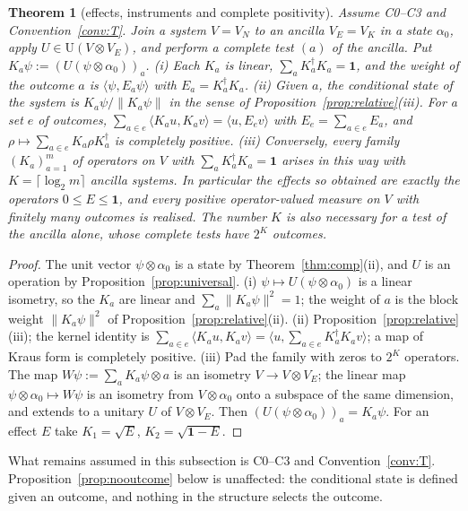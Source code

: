 \documentclass[aps,pra,onecolumn,superscriptaddress,nofootinbib,10pt]{revtex4-2}
\newtheorem{theorem}{Theorem}
\theoremstyle{definition}
\theoremstyle{remark}
\newcommand{\ip}[2]{\langle #1,#2\rangle}
\newcommand{\U}{\mathrm{U}}
\begin{document}
\begin{theorem}[effects, instruments and complete positivity]\label{thm:instruments}
Assume C0--C3 and Convention~\ref{conv:T}.  Join a system $V=V_N$ to
an ancilla $V_E=V_K$ in a state $\alpha_0$, apply $U\in\U(V\otimes V_E)$, and perform a complete test
$(a)$ of the ancilla.  Put $K_a\psi:=(U(\psi\otimes\alpha_0))_a$.
(i) Each $K_a$ is linear, $\sum_aK_a^\dagger K_a=\mathbf1$, and the weight of the outcome $a$ is
$\ip{\psi}{E_a\psi}$ with $E_a=K_a^\dagger K_a$.
(ii) Given $a$, the conditional state of the system is $K_a\psi/\lVert K_a\psi\rVert$ in the sense of
Proposition~\ref{prop:relative}(iii).  For a set $e$ of outcomes,
$\sum_{a\in e}\ip{K_au}{K_av}=\ip{u}{E_ev}$ with $E_e=\sum_{a\in e}E_a$, and
$\rho\mapsto\sum_{a\in e}K_a\rho K_a^\dagger$ is completely positive.
(iii) Conversely, every family $(K_a)_{a=1}^m$ of operators on $V$ with $\sum_aK_a^\dagger K_a=\mathbf1$
arises in this way with $K=\lceil\log_2m\rceil$ ancilla systems.  In particular the effects so obtained are
exactly the operators $0\le E\le\mathbf1$, and every positive operator-valued measure on $V$ with
finitely many outcomes is realised.  The number $K$ is also necessary for a test of the ancilla alone,
whose complete tests have $2^K$ outcomes.
\end{theorem}
\begin{proof}
The unit vector $\psi\otimes\alpha_0$ is a state by Theorem~\ref{thm:comp}(ii), and $U$ is an
operation by Proposition~\ref{prop:universal}.  (i) $\psi\mapsto U(\psi\otimes\alpha_0)$
is a linear isometry, so the $K_a$ are linear and $\sum_a\lVert K_a\psi\rVert^2=1$; the weight of $a$ is
the block weight $\lVert K_a\psi\rVert^2$ of Proposition~\ref{prop:relative}(ii).  (ii) Proposition~\ref{prop:relative}(iii);
the kernel identity is $\sum_{a\in e}\ip{K_au}{K_av}=\ip{u}{\sum_{a\in e}K_a^\dagger K_av}$; a map of Kraus
form is completely positive.  (iii) Pad the family with zeros to $2^K$ operators.  The map
$W\psi:=\sum_aK_a\psi\otimes a$ is an isometry $V\to V\otimes V_E$; the linear map
$\psi\otimes\alpha_0\mapsto W\psi$ is an isometry from $V\otimes\alpha_0$ onto a subspace of the same
dimension, and extends to a unitary $U$ of $V\otimes V_E$.  Then $(U(\psi\otimes\alpha_0))_a=K_a\psi$.  For an
effect $E$ take $K_1=\sqrt E$, $K_2=\sqrt{\mathbf1-E}$.
\end{proof}
What remains assumed in this subsection is C0--C3 and
Convention~\ref{conv:T}.  Proposition~\ref{prop:nooutcome} below is unaffected: the conditional state is
defined given an outcome, and nothing in the structure selects the outcome.
\end{document}

